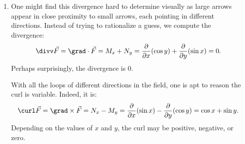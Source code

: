 \begin{example}
\begin{enumerate}
	\item
%
%
		One might find this divergence hard to determine visually as large arrows appear in close proximity to small arrows, each pointing in different directions. Instead of trying to rationalize a guess, we compute the divergence:
	\[
	\divv\vec F = \grad \cdot \vec F = M_x + N_y
	= \frac{\partial}{\partial x}(\cos y) + \frac{\partial}{\partial y}(\sin x) = 0.
	\] 
	Perhaps surprisingly, the divergence is 0.
	
	With all the loops of different directions in the field, one is apt to reason the curl is variable. Indeed, it is:
	\[
	\curl \vec F = \grad\times\vec F = N_x-M_y
	= \frac{\partial}{\partial x}(\sin x) - \frac{\partial}{\partial y}(\cos y)
	= \cos x + \sin y.
	\]
	Depending on the values of $x$ and $y$, the curl may be positive, negative, or zero.
\end{enumerate}
\end{example}

